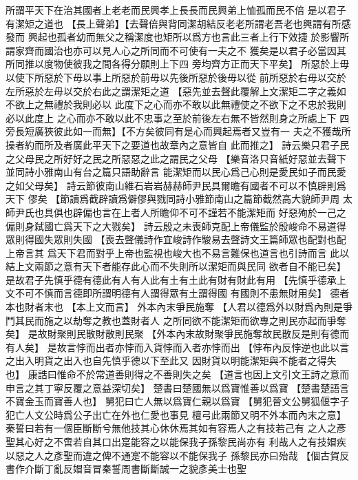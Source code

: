 \documentclass{zhvt-classic}
\begin{document}
所謂平天下在治其國者上老老而民興孝上長長而民興弟上恤孤而民不倍
是以君子有潔矩之道也
  【長上聲弟】\zhvph【去聲倍與背同潔胡結反老老所謂老吾老也興謂有所感發而
    興起也孤者幼而無父之稱潔度也矩所以爲方也言此三者上行下效捷
    於影響所謂家齊而國治也亦可以見人心之所同而不可使有一夫之不
    獲矣是以君子必當因其所同推以度物使彼我之間各得分願則上下四
    旁均齊方正而天下平矣】
所惡於上毋以使下所惡於下毋以事上所惡於前毋以先後所惡於後毋以從
前所惡於右毋以交於左所惡於左毋以交於右此之謂潔矩之道
  【惡先並去聲此覆解上文潔矩二字之義如不欲上之無禮於我則必以
    此度下之心而亦不敢以此無禮使之不欲下之不忠於我則必以此度上
    之心而亦不敢以此不忠事之至於前後左右無不皆然則身之所處上下
    四旁長短廣狹彼此如一而無】\zhvph【不方矣彼同有是心而興起焉者又豈有一
    夫之不獲哉所操者約而所及者廣此平天下之要道也故章內之意皆自
    此而推之】
詩云樂只君子民之父母民之所好好之民之所惡惡之此之謂民之父母
  【樂音洛只音紙好惡並去聲下並同詩小雅南山有台之篇只語助辭言
    能潔矩而以民心爲己心則是愛民如子而民愛之如父母矣】
詩云節彼南山維石岩岩赫赫師尹民具爾瞻有國者不可以不慎辟則爲天下
僇矣
  【節讀爲截辟讀爲僻僇與戮同詩小雅節南山之篇節截然高大貌師尹周
    太師尹氏也具俱也辟偏也言在上者人所瞻仰不可不謹若不能潔矩而
    好惡殉於一己之偏則身弑國亡爲天下之大戮矣】
詩云殷之未喪師克配上帝儀監於殷峻命不易道得眾則得國失眾則失國
  【喪去聲儀詩作宜峻詩作駿易去聲詩文王篇師眾也配對也配上帝言其
    爲天下君而對乎上帝也監視也峻大也不易言難保也道言也引詩而言
    此以結上文兩節之意有天下者能存此心而不失則所以潔矩而與民同
    欲者自不能已矣】
是故君子先慎乎德有德此有人有人此有土有土此有財有財此有用
  【先慎乎德承上文不可不慎而言德即所謂明德有人謂得眾有土謂得國
    有國則不患無財用矣】
德者本也財者末也
  【本上文而言】
外本內末爭民施奪
  【人君以德爲外以財爲內則是爭鬥其民而施之以劫奪之教也蓋財者人
    之所同欲不能潔矩而欲專之則民亦起而爭奪矣】
是故財聚則民散財散則民聚
  【外本內末故財聚爭民施奪故民散反是則有德而有人矣】
是故言悖而出者亦悖而入貨悖而入者亦悖而出
  【悖布內反悖逆也此以言之出入明貨之出入也自先慎乎德以下至此又
    因財貨以明能潔矩與不能者之得失也】
康誥曰惟命不於常道善則得之不善則失之矣
  【道言也因上文引文王詩之意而申言之其丁寧反覆之意益深切矣】
楚書曰楚國無以爲寶惟善以爲寶
  【楚書楚語言不寶金玉而寶善人也】
舅犯曰亡人無以爲寶仁親以爲寶
  【舅犯晉文公舅狐偃字子犯亡人文公時爲公子出亡在外也仁愛也事見
    檀弓此兩節又明不外本而內末之意】
秦誓曰若有一個臣斷斷兮無他技其心休休焉其如有容焉人之有技若己有
之人之彥聖其心好之不啻若自其口出寔能容之以能保我子孫黎民尚亦有
利哉人之有技媢疾以惡之人之彥聖而違之俾不通寔不能容以不能保我子
孫黎民亦曰殆哉
  【個古賀反書作介斷丁亂反媢音冒秦誓周書斷斷誠一之貌彥美士也聖
\end{document}
